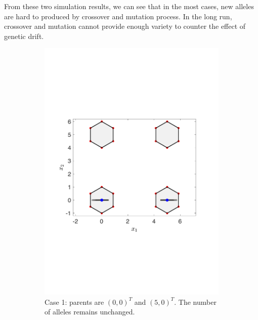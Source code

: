 \documentclass[conference]{IEEEtran}
\begin{document}
From these two simulation results, we can see that in the most cases, new alleles are hard to produced by crossover and mutation process. In the long run, crossover and mutation cannot provide enough variety to counter the effect of genetic drift. 
\begin{figure}[htbp]
	\centering
	\begin{subfigure}[b]{.24\textwidth}
		\includegraphics[width=\linewidth]{Section3/crossover1}
		\caption{Case 1: parents are $(0, 0)^T$ and $(5, 0)^T$. The number of alleles remains unchanged.}
		\label{fig: SBX crossover case 1}
	\end{subfigure}
	\begin{subfigure}[b]{.24\textwidth}

\end{subfigure}
\end{figure}
\end{document}
